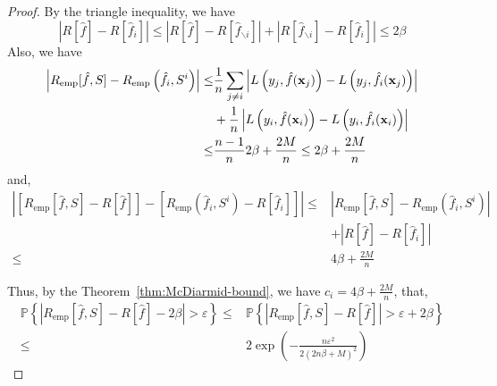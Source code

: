 \begin{proof}
	By the triangle inequality, we have
	\begin{equation}
		\left|R[\hat{f}]-R[\hat{f}_{i}]\right|\leq\left|R[\hat{f}]-R[\hat{f}_{\backslash i}]\right|+\left|R[\hat{f}_{\backslash i}]-R[\hat{f}_{i}]\right|\leq 2\beta
	\end{equation}
	Also, we have
	\begin{equation}
		\begin{aligned}
			\left|R_{\text{emp}}[\hat{f},S]-R_{\text{emp}}\left(\hat{f}_{i},S^{i}\right)\right|\leq & \frac{1}{n}\sum_{j\neq i}\left|L\left(y_{j},\hat{f}({\bf x}_{j})\right)-L\left(y_{j},\hat{f}_{i}({\bf x}_{j})\right)\right| \\
			                                                                                        & +\frac{1}{n}\left|L\left(y_{i},\hat{f}({\bf x}_{i})\right)-L\left(y_{i},\hat{f}_{i}({\bf x}_{i})\right)\right|              \\
			\leq                                                                                    & \frac{n-1}{n}2\beta+\frac{2M}{n}\leq 2\beta+\frac{2M}{n}
		\end{aligned}
	\end{equation}
	and,
	\begin{equation}
		\begin{aligned}
			\left|\left[R_{\text{emp}}[\hat{f},S]-R[\hat{f}]\right]-\left[R_{\text{emp}}\left(\hat{f}_{i},S^{i}\right)-R[\hat{f}_{i}]\right]\right|\leq & \left|R_{\text{emp}}[\hat{f},S]-R_{\text{emp}}\left(\hat{f}_{i},S^{i}\right)\right| \\
			                                                                                                                                            & +\left|R[\hat{f}]-R[\hat{f}_{i}]\right|                                             \\
			\leq                                                                                                                                        & 4\beta+\frac{2M}{n}
		\end{aligned}
	\end{equation}

	Thus, by the Theorem~\ref{thm:McDiarmid-bound}, we have $c_{i}=4\beta+\frac{2M}{n}$, that,
	\begin{equation}
		\begin{aligned}
			\mathbb{P}\left\{|R_{\text{emp}}[\hat{f},S]-R[\hat{f}]-2\beta|>\varepsilon\right\}\leq & \mathbb{P}\left\{|R_{\text{emp}}[\hat{f},S]-R[\hat{f}]|>\varepsilon+2\beta\right\} \\
			\leq                                                                                   & 2\exp\left(-\frac{n\varepsilon^{2}}{2(2n\beta+M)^{2}}\right)
		\end{aligned}
	\end{equation}
\end{proof}


